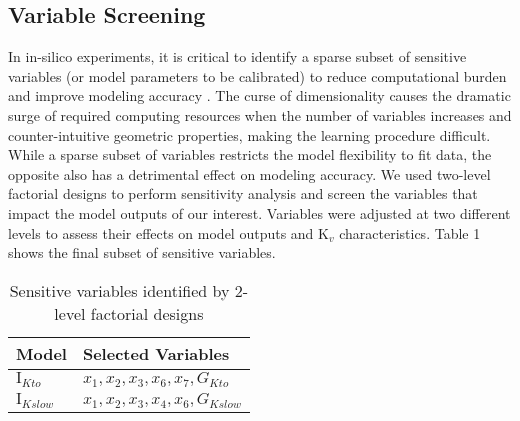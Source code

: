\documentclass[journal]{IEEEtran}
\begin{document}
\subsection{Variable Screening}
In in-silico experiments, it is critical to identify a sparse subset of sensitive variables (or model parameters to be calibrated) to reduce computational burden and improve modeling accuracy \cite{verleysen2005curse}. The curse of dimensionality causes the dramatic surge of required computing resources when the number of variables increases and counter-intuitive geometric properties, making the learning procedure difficult. While a sparse subset of variables restricts the model flexibility to fit data, the opposite also has a detrimental effect on modeling accuracy. We used two-level factorial designs to perform sensitivity analysis and screen the variables that impact the model outputs of our interest. Variables were adjusted at two different levels to assess their effects on model outputs and $\text{K}_{v}$ characteristics. Table 1 shows the final subset of sensitive variables.

\begin{table}
    \caption{Sensitive variables identified by 2-level factorial designs}
    \label{table1}
    \centering
    \begin{tabular}{ll}
        \toprule
        Model & Selected Variables  \\ 
        \hline
        $\text{I}_{Kto}$ & $x_1, x_2, x_3, x_6, x_7, G_{Kto}$ \\
        $\text{I}_{Kslow}$ & $x_1, x_2, x_3, x_4, x_6, G_{Kslow}$ \\
        \bottomrule
    \end{tabular}
\end{table}
\end{document}
